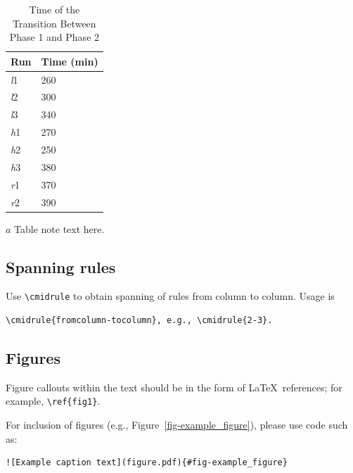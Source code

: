\documentclass[]{imag-ms-template}
\theoremstyle{plain}
\theoremstyle{remark}
\begin{document}
\begin{table}[h!]
\begin{threeparttable}
\caption{Time of the Transition Between Phase 1 and Phase 2
\label{tab:label}}
\setlength{\tabcolsep}{45pt}%
\begin{tabular}{@{}ll}
\toprule
 Run  & Time (min)  \\
\midrule
  \textit{l}1  & 260   \\
  \textit{l}2  & 300   \\
  \textit{l}3  & 340   \\
  \textit{h}1  & 270   \\
  \textit{h}2  & 250   \\
  \textit{h}3  & 380   \\
  \textit{r}1  & 370   \\
  \textit{r}2  & 390   \\
\bottomrule
\end{tabular}
\begin{tablenotes}[flushleft]\footnotesize
\item[${a}$]Table note text here.
\end{tablenotes}
\end{threeparttable}
\end{table}

\subsection*{Spanning rules}\label{spanning-rules}

Use \verb!\cmidrule! to obtain spanning of rules from column to column.
Usage is

\begin{verbatim}
\cmidrule{fromcolumn-tocolumn}, e.g., \cmidrule{2-3}.
\end{verbatim}

\subsection{Figures}\label{figures}

Figure callouts within the text should be in the form of
\LaTeX~references; for example, \verb+\ref{fig1}+.

For inclusion of figures (e.g., Figure~\ref{fig-example_figure}), please
use code such as:

\begin{verbatim}
![Example caption text](figure.pdf){#fig-example_figure}
\end{verbatim}
\end{document}

